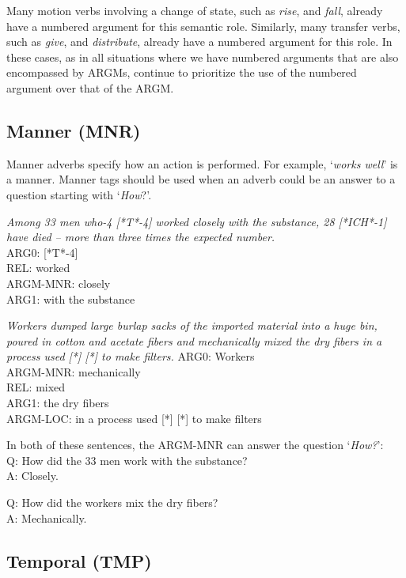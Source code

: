 \documentclass[11pt]{report}
\begin{document}
\noindent Many motion verbs involving a change of state, such as \textit{rise}, and \textit{fall}, already have a numbered argument for this semantic role.  Similarly, many transfer verbs, such as \textit{give}, and \textit{distribute}, already have a numbered argument for this role.  In these cases, as in all situations where we have numbered arguments that are also encompassed by ARGMs, continue to prioritize the use of the numbered argument over that of the ARGM.  

\subsection{Manner (MNR)}
\label{ssec: MNR}

Manner adverbs specify how an action is performed. For example, `\textit{works well}' is a manner. Manner tags should be used when an adverb could be an answer to a question starting with `\textit{How}?'.

\textit{Among 33 men who-4 [*T*-4] worked closely with the substance, 28 [*ICH*-1] have died -- more than three times the expected number.}\\
ARG0: [*T*-4]   \\
REL: worked \\
ARGM-MNR: closely\\ 
ARG1: with the substance

\textit{Workers dumped large burlap sacks of the imported material into a huge bin, poured in cotton and acetate fibers and mechanically mixed the dry fibers in a process used [*] [*] to make filters.}
ARG0: Workers \\
ARGM-MNR: mechanically\\ 
REL: mixed \\
ARG1: the dry fibers\\ 
ARGM-LOC: in a process used [*] [*] to make filters

In both of these sentences, the ARGM-MNR can answer the question `\textit{How?}': \\
Q: How did the 33 men work with the substance? \\
A: Closely. 

Q: How did the workers mix the dry fibers? \\
A: Mechanically.

\subsection{Temporal (TMP)}
\label{ssec: TMP}
\end{document}
